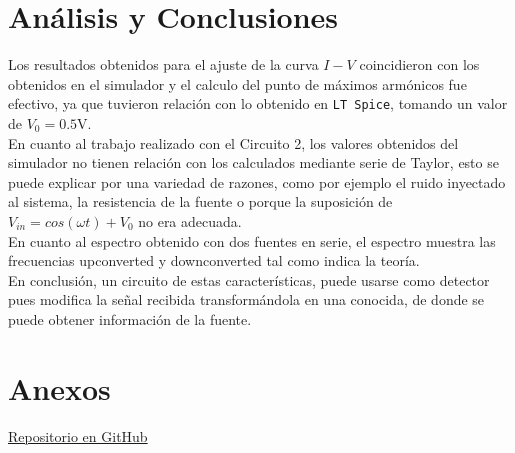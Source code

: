 \documentclass[letterpaper,oneside]{article}
\begin{document}
\section{Análisis y Conclusiones}
Los resultados obtenidos para el ajuste de la curva $I-V$ coincidieron con los obtenidos en el simulador y el calculo del punto de máximos armónicos fue efectivo, ya que tuvieron relación con lo obtenido en \texttt{LT Spice}, tomando un valor de $V_0 = 0.5$V. \\

En cuanto al trabajo realizado con el Circuito 2, los valores obtenidos del simulador no tienen relación con los calculados mediante serie de Taylor, esto se puede explicar por una variedad de razones, como por ejemplo el ruido inyectado al sistema, la resistencia de la fuente o porque la suposición de $V_{in} = cos(\omega t) + V_0$ no era adecuada.\\

En cuanto al espectro obtenido con dos fuentes en serie, el espectro muestra las frecuencias upconverted y downconverted tal como indica la teoría.\\

En conclusión, un circuito de estas características, puede usarse como detector pues modifica la señal recibida transformándola en una conocida, de donde se puede obtener información de la fuente.

\section{Anexos}
\href{https://github.com/vecheto/astro_experimental/tree/main/Tarea\%202}{Repositorio en GitHub}
\end{document}
